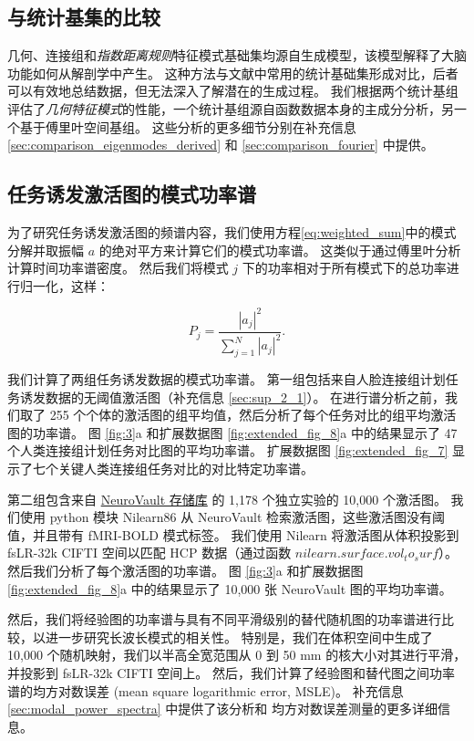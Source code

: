 \documentclass[lang=cn,a4paper,newtx,citestyle=gb7714-2015, bibstyle=gb7714-2015]{elegantpaper}
\begin{document}
\subsection{与统计基集的比较} \label{sec:sets_comparisons}

几何、连接组和\textit{指数距离规则}特征模式基础集均源自生成模型，该模型解释了大脑功能如何从解剖学中产生。
这种方法与文献中常用的统计基础集形成对比，后者可以有效地总结数据，但无法深入了解潜在的生成过程。
我们根据两个统计基组评估了\textit{几何特征模式}的性能，一个统计基组源自函数数据本身的主成分分析，另一个基于傅里叶空间基组。
这些分析的更多细节分别在补充信息\ref{sec:comparison_eigenmodes_derived} 和 \ref{sec:comparison_fourier} 中提供。

\subsection{任务诱发激活图的模式功率谱} \label{sec:modal_power}

为了研究任务诱发激活图的频谱内容，我们使用方程\ref{eq:weighted_sum}中的模式分解并取振幅 $ a $ 的绝对平方来计算它们的模式功率谱。
这类似于通过傅里叶分析计算时间功率谱密度。
然后我们将模式 $ j $ 下的功率相对于所有模式下的总功率进行归一化，这样：

\begin{equation}\label{eq:normalized_power}
	P_j = \frac{|a_j|^2}{\sum_{j=1}^{N} |a_j|^2 }.
\end{equation}

我们计算了两组任务诱发数据的模式功率谱。
第一组包括来自人脸连接组计划任务诱发数据的无阈值激活图（补充信息 \ref{sec:sup_2_1}）。
在进行谱分析之前，我们取了 255 个个体的激活图的组平均值，然后分析了每个任务对比的组平均激活图的功率谱。
图 \ref{fig:3}a 和扩展数据图 \ref{fig:extended_fig_8}a 中的结果显示了 47 个人类连接组计划任务对比图的平均功率谱。 
扩展数据图 \ref{fig:extended_fig_7} 显示了七个关键人类连接组任务对比的对比特定功率谱。


第二组包含来自 \href{https://neuroVault.org/}{NeuroVault 存储库}\cite{gorgolewski2015neurovault} 的 1,178 个独立实验的 10,000 个激活图。
我们使用 python 模块 Nilearn86 从 NeuroVault 检索激活图，这些激活图没有阈值，并且带有 fMRI-BOLD 模式标签。
我们使用 Nilearn 将激活图从体积投影到 fsLR-32k CIFTI 空间以匹配 HCP 数据（通过函数 $ nilearn.surface.vol_to_surf $）。
然后我们分析了每个激活图的功率谱。
图 \ref{fig:3}a 和扩展数据图 \ref{fig:extended_fig_8}a 中的结果显示了 10,000 张 NeuroVault 图的平均功率谱。


然后，我们将经验图的功率谱与具有不同平滑级别的替代随机图的功率谱进行比较，以进一步研究长波长模式的相关性。
特别是，我们在体积空间中生成了 10,000 个随机映射，我们以半高全宽范围从 0 到 50 mm 的核大小对其进行平滑，并投影到 fsLR-32k CIFTI 空间上。
然后，我们计算了经验图和替代图之间功率谱的均方对数误差 (mean square logarithmic error, MSLE)。
补充信息 \ref{sec:modal_power_spectra} 中提供了该分析和 均方对数误差测量的更多详细信息。
\end{document}
